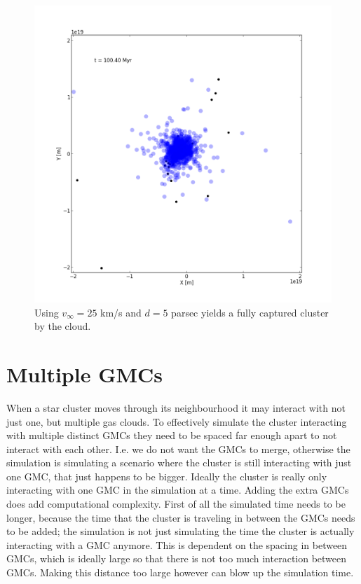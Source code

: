 \documentclass{aa}
\begin{document}
\begin{figure}
    \centering
    \includegraphics[width=\hsize]{img/v_25_d_5.png}
    \caption{Using $v_\infty = 25$ km/s and $d = 5$ parsec yields a fully captured cluster by the cloud.}\label{fig:v_25_d_5}
\end{figure}

\section{Multiple GMCs}
When a star cluster moves through its neighbourhood it may interact with not just one, but multiple gas clouds. To effectively simulate the cluster interacting with multiple distinct GMCs they need to be spaced far enough apart to not interact with each other. I.e. we do not want the GMCs to merge, otherwise the simulation is simulating a scenario where the cluster is still interacting with just one GMC, that just happens to be bigger. Ideally the cluster is really only interacting with one GMC in the simulation at a time. Adding the extra GMCs does add computational complexity. First of all the simulated time needs to be longer, because the time that the cluster is traveling in between the GMCs needs to be added; the simulation is not just simulating the time the cluster is actually interacting with a GMC anymore. This is dependent on the spacing in between GMCs, which is ideally large so that there is not too much interaction between GMCs. Making this distance too large however can blow up the simulation time.
\end{document}
